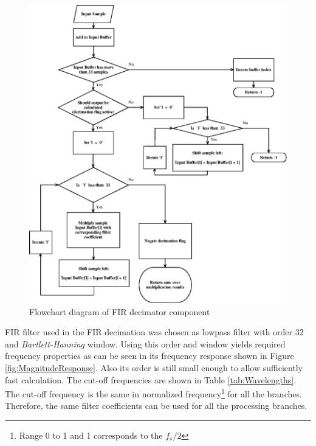 \documentclass[twoside]{ctuthesis}
\theoremstyle{plain}
\theoremstyle{definition}
\theoremstyle{note}
\begin{document}
\begin{figure}[h]
	\centering
	\includegraphics[width=1.0\textwidth]{firDecimator.eps}
	\caption{Flowchart diagram of FIR decimator component}
	\label{fig:FIR_decimator}
\end{figure}
FIR filter used in the FIR decimation was chosen as lowpass filter with order 32 and \textit{Bartlett-Hanning} window. Using this order and window yields required frequency properties as can be seen in its frequency response shown in Figure \ref{fig:MagnitudeResponse}. Also its order is still small enough to allow sufficiently fast calculation. The cut-off frequencies are shown in Table \ref{tab:Wavelengths}. The cut-off frequency is the same in normalized frequency\footnote{Range 0 to 1 and 1 corresponds to the $f_s/2$} for all the branches. Therefore, the same filter coefficients can be used for all the processing branches.
\end{document}
